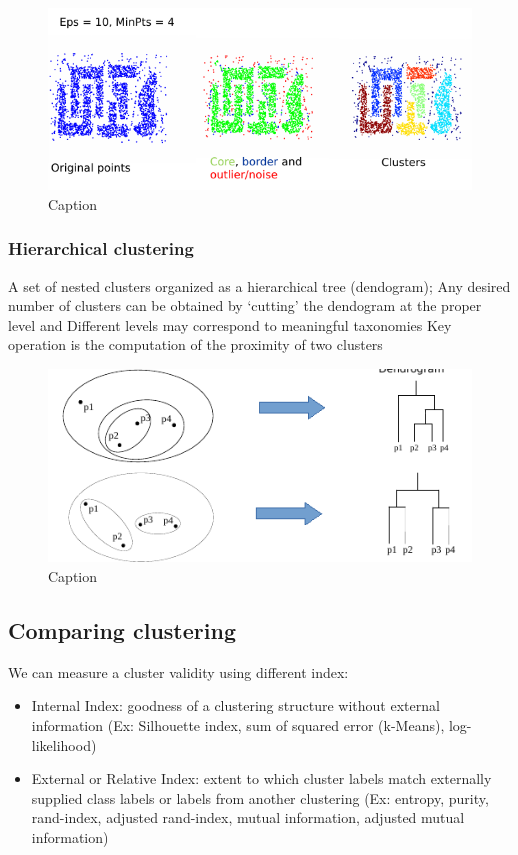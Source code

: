 \begin{figure}[H]
    \centering
    \includegraphics{images/CL/CL6.png}
    \caption{Caption}
    \label{fig:enter-label}
\end{figure}

\subsubsection{Hierarchical clustering}
A set of nested clusters organized as a hierarchical tree (dendogram); Any desired number of clusters can be obtained by ‘cutting’ the dendogram at the proper level and Different levels may correspond to meaningful taxonomies Key operation is the computation of the proximity of two clusters
\begin{figure}[H]
    \centering
    \includegraphics{images/CL/CL7.png}
    \caption{Caption}
    \label{fig:enter-label}
\end{figure}

\subsection{Comparing clustering}

We can measure a cluster validity using different index:
\begin{itemize}
    \item Internal Index: goodness of a clustering structure without external information (Ex: Silhouette index, sum of squared error (k-Means), log-likelihood)
    \item External or Relative Index: extent to which cluster labels match externally supplied class labels or labels from another clustering (Ex: entropy, purity, rand-index, adjusted rand-index, mutual information, adjusted mutual information)
\end{itemize}

